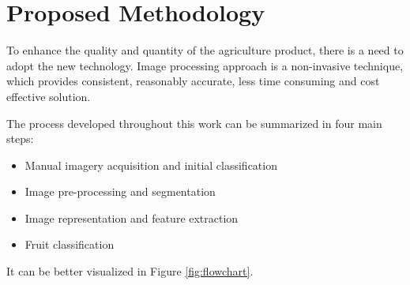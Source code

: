 \documentclass[../main.tex]{subfile}
\begin{document}
\section{Proposed Methodology} \label{sec:proposed-methodology}

To enhance the quality and quantity of the agriculture product, there is a need to adopt the new technology. Image processing approach is a non-invasive technique, which provides consistent, reasonably accurate, less time consuming and cost effective solution.



The process developed throughout this work can be summarized in four main steps:
\begin{itemize}
    \item Manual imagery acquisition and initial classification
    \item Image pre-processing and segmentation
    \item Image representation and feature extraction
    \item Fruit classification
\end{itemize}
It can be better visualized in Figure \ref{fig:flowchart}.
\end{document}
